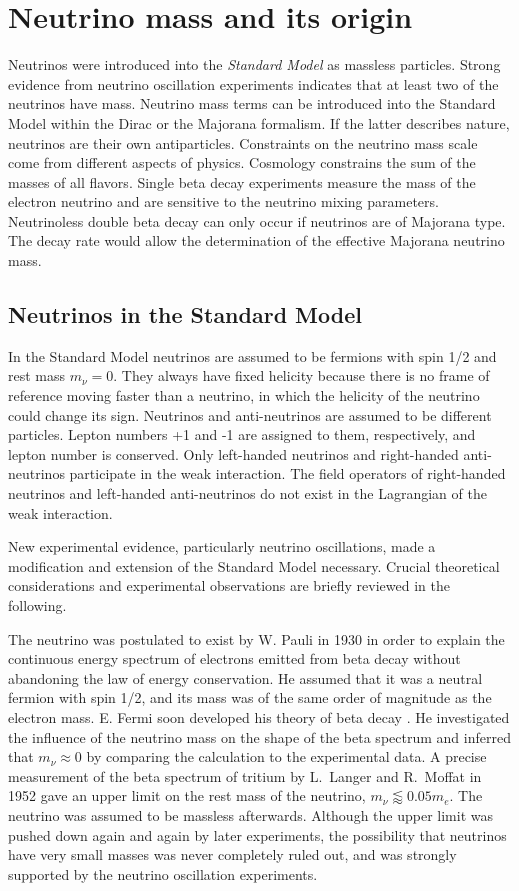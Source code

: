 \chapter{Neutrino mass and its origin}
\label{cha:theory}
Neutrinos were introduced into the \emph{Standard Model} as massless
particles. Strong evidence from neutrino oscillation experiments
indicates that at least two of the neutrinos have mass. Neutrino mass
terms can be introduced into the Standard Model within the Dirac or
the Majorana formalism. If the latter describes nature, neutrinos are
their own antiparticles. Constraints on the neutrino mass scale come
from different aspects of physics. Cosmology constrains the sum of the
masses of all flavors. Single beta decay experiments measure the mass
of the electron neutrino and are sensitive to the neutrino mixing
parameters. Neutrinoless double beta decay can only occur if neutrinos
are of Majorana type. The decay rate would allow the determination of
the effective Majorana neutrino mass.

\section{Neutrinos in the Standard Model}
\label{sec:sm}
In the Standard Model neutrinos are assumed to be fermions with spin
1/2 and rest mass $m_\nu=0$. They always have fixed helicity because
there is no frame of reference moving faster than a neutrino, in which
the helicity of the neutrino could change its sign. Neutrinos and
anti-neutrinos are assumed to be different particles. Lepton numbers
+1 and -1 are assigned to them, respectively, and lepton number is
conserved. Only left-handed neutrinos and right-handed anti-neutrinos
participate in the weak interaction. The field operators of
right-handed neutrinos and left-handed anti-neutrinos do not exist in
the Lagrangian of the weak interaction.

New experimental evidence, particularly neutrino oscillations, made a
modification and extension of the Standard Model necessary. Crucial
theoretical considerations and experimental observations are briefly
reviewed in the following.

The neutrino was postulated to exist by W. Pauli in 1930 \cite{Pau30}
in order to explain the continuous energy spectrum of electrons
emitted from beta decay without abandoning the law of energy
conservation. He assumed that it was a neutral fermion with spin 1/2,
and its mass was of the same order of magnitude as the electron
mass. E. Fermi soon developed his theory of beta decay \cite{Fer33,
Fer34}. He investigated the influence of the neutrino mass on the
shape of the beta spectrum and inferred that $m_\nu \approx 0$ by
comparing the calculation to the experimental data. A precise
measurement of the beta spectrum of tritium by L.~Langer and R.~Moffat
in 1952 \cite{Lan52} gave an upper limit on the rest mass of the
neutrino, $m_\nu \lessapprox 0.05 m_e$. The neutrino was assumed to be
massless afterwards. Although the upper limit was pushed down again
and again by later experiments, the possibility that neutrinos have
very small masses was never completely ruled out, and was strongly
supported by the neutrino oscillation experiments.

